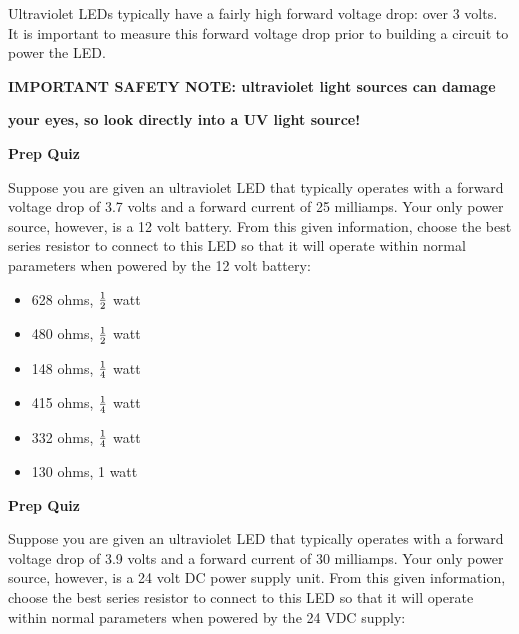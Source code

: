 












Ultraviolet LEDs typically have a fairly high forward voltage drop: over 3 volts.  It is important to measure this forward voltage drop prior to building a circuit to power the LED.

\vskip 10pt

\centerline{\bf IMPORTANT SAFETY NOTE: ultraviolet light sources can damage}
\centerline{\bf your eyes, so  look directly into a UV light source!}




\vfil \eject

\noindent
{\bf Prep Quiz}

Suppose you are given an ultraviolet LED that typically operates with a forward voltage drop of 3.7 volts and a forward current of 25 milliamps.  Your only power source, however, is a 12 volt battery.  From this given information, choose the best series resistor to connect to this LED so that it will operate within normal parameters when powered by the 12 volt battery:

\begin{itemize}
\item{} 628 ohms, $1 \over 2$ watt
\vskip 5pt
\item{} 480 ohms, $1 \over 2$ watt
\vskip 5pt
\item{} 148 ohms, $1 \over 4$ watt
\vskip 5pt
\item{} 415 ohms, $1 \over 4$ watt
\vskip 5pt
\item{} 332 ohms, $1 \over 4$ watt
\vskip 5pt
\item{} 130 ohms, 1 watt
\end{itemize}



\vfil \eject

\noindent
{\bf Prep Quiz}

Suppose you are given an ultraviolet LED that typically operates with a forward voltage drop of 3.9 volts and a forward current of 30 milliamps.  Your only power source, however, is a 24 volt DC power supply unit.  From this given information, choose the best series resistor to connect to this LED so that it will operate within normal parameters when powered by the 24 VDC supply:


